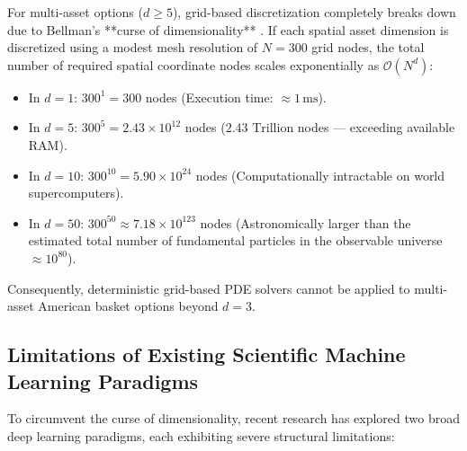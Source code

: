 \documentclass[11pt,a4paper]{article}
\begin{document}
For multi-asset options ($d \ge 5$), grid-based discretization completely breaks down due to Bellman's **curse of dimensionality** \cite{bellman1966dynamic}. If each spatial asset dimension is discretized using a modest mesh resolution of $N = 300$ grid nodes, the total number of required spatial coordinate nodes scales exponentially as $\mathcal{O}(N^d)$:
\begin{itemize}
    \item In $d = 1$: $300^1 = 300$ nodes (Execution time: $\approx 1\,\text{ms}$).
    \item In $d = 5$: $300^5 = 2.43 \times 10^{12}$ nodes ($2.43\text{ Trillion}$ nodes — exceeding available RAM).
    \item In $d = 10$: $300^{10} = 5.90 \times 10^{24}$ nodes (Computationally intractable on world supercomputers).
    \item In $d = 50$: $300^{50} \approx 7.18 \times 10^{123}$ nodes (Astronomically larger than the estimated total number of fundamental particles in the observable universe $\approx 10^{80}$).
\end{itemize}
Consequently, deterministic grid-based PDE solvers cannot be applied to multi-asset American basket options beyond $d=3$.

\subsection{Limitations of Existing Scientific Machine Learning Paradigms}
To circumvent the curse of dimensionality, recent research has explored two broad deep learning paradigms, each exhibiting severe structural limitations:
\end{document}
